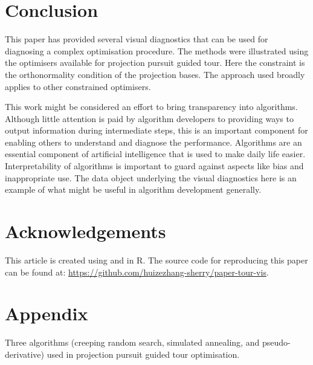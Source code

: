 \hypertarget{conclusion}{%
\section{Conclusion}\label{conclusion}}

This paper has provided several visual diagnostics that can be used for
diagnosing a complex optimisation procedure. The methods were
illustrated using the optimisers available for projection pursuit guided
tour. Here the constraint is the orthonormality condition of the
projection bases. The approach used broadly applies to other constrained
optimisers.

This work might be considered an effort to bring transparency into
algorithms. Although little attention is paid by algorithm developers to
providing ways to output information during intermediate steps, this is
an important component for enabling others to understand and diagnose
the performance. Algorithms are an essential component of artificial
intelligence that is used to make daily life easier. Interpretability of
algorithms is important to guard against aspects like bias and
inappropriate use. The data object underlying the visual diagnostics
here is an example of what might be useful in algorithm development
generally.

\hypertarget{acknowledgements}{%
\section{Acknowledgements}\label{acknowledgements}}

This article is created using  \citep{knitr} and
 \citep{rmarkdown} in R. The source code for
reproducing this paper can be found at:
\url{https://github.com/huizezhang-sherry/paper-tour-vis}.



\newpage

\hypertarget{appendix}{%
\section{Appendix}\label{appendix}}

Three algorithms (creeping random search, simulated annealing, and
pseudo-derivative) used in projection pursuit guided tour optimisation.

